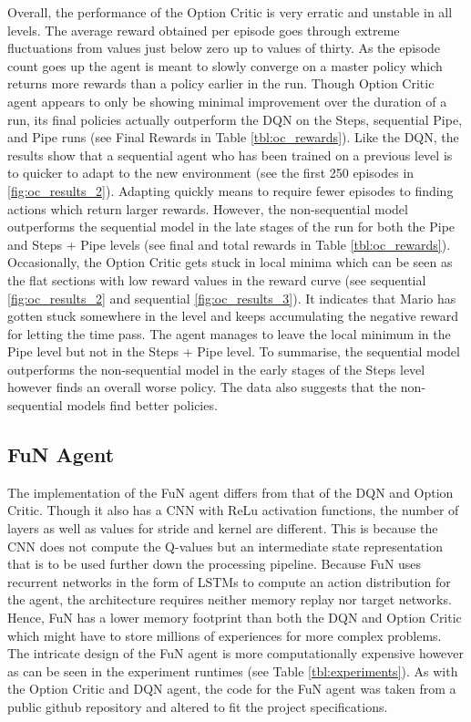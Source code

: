 \documentclass[notitlepage,a4paper,11pt]{article}
\begin{document}
Overall, the performance of the Option Critic is very erratic and unstable in all levels. The average reward obtained per episode goes through extreme fluctuations from values just below zero up to values of thirty. As the episode count goes up the agent is meant to slowly converge on a master policy which returns more rewards than a policy earlier in the run. Though Option Critic agent appears to only be showing minimal improvement over the duration of a run, its final policies actually outperform the DQN on the Steps, sequential Pipe, and Pipe runs (see Final Rewards in Table \ref{tbl:oc_rewards}). Like the DQN, the results show that a sequential agent who has been trained on a previous level is to quicker to adapt to the new environment (see the first 250 episodes in \ref{fig:oc_results_2}). Adapting quickly means to require fewer episodes to finding actions which return larger rewards. However, the non-sequential model outperforms the sequential model in the late stages of the run for both the Pipe and Steps + Pipe levels (see final and total rewards in Table \ref{tbl:oc_rewards}). Occasionally, the Option Critic gets stuck in local minima which can be seen as the flat sections with low reward values in the reward curve (see sequential \ref{fig:oc_results_2} and sequential \ref{fig:oc_results_3}). It indicates that Mario has gotten stuck somewhere in the level and keeps accumulating the negative reward for letting the time pass. The agent manages to leave the local minimum in the Pipe level but not in the Steps + Pipe level. To summarise, the sequential model outperforms the non-sequential model in the early stages of the Steps level however finds an overall worse policy. The data also suggests that the non-sequential models find better policies. 



\subsection{FuN Agent}\label{fun_experiment}
The implementation of the FuN agent differs from that of the DQN and Option Critic. Though it also has a CNN with ReLu activation functions, the number of layers as well as values for stride and kernel are different. This is because the CNN does not compute the Q-values but an intermediate state representation that is to be used further down the processing pipeline. Because FuN uses recurrent networks in the form of LSTMs to compute an action distribution for the agent, the architecture requires neither memory replay nor target networks. Hence, FuN has a lower memory footprint than both the DQN and Option Critic which might have to store millions of experiences for more complex problems. The intricate design of the FuN agent is more computationally expensive however as can be seen in the experiment runtimes (see Table \ref{tbl:experiments}). As with the Option Critic and DQN agent, the code for the FuN agent was taken from a public github repository \cite{fun_github} and altered to fit the project specifications.
\end{document}
